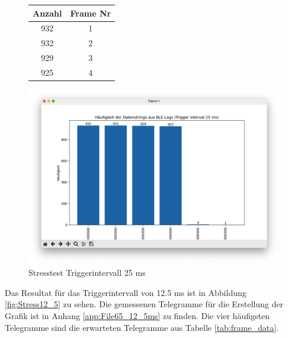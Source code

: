 \begin{figure}[H]
    \centering
    \begin{minipage}{0.29 \textwidth}
        \begin{tabular}{c||c}
            \toprule
            \textbf{Anzahl} & \textbf{Frame Nr} \\ 
            \midrule
            932 & 1\\
            932 & 2\\
            929 & 3\\
            925 & 4\\
            \bottomrule
        \end{tabular}
    \end{minipage}
    \hfill
    \begin{minipage}{0.7 \textwidth}
        \includegraphics[width=\linewidth]{Figures/Chap4/Stesstest/Stress_25.png}
    \caption{Stresstest Triggerintervall 25 ms}
    \label{fig:Stress25}
    \end{minipage}
\end{figure}

Das Resultat für das Triggerintervall von 12.5 ms ist in Abbildung \ref{fig:Stress12_5} zu sehen. Die gemessenen Telegramme für die Erstellung der Grafik ist in Anhang \ref{app:File65_12_5ms} zu finden. Die vier häufigsten Telegramme sind die erwarteten Telegramme aus Tabelle \ref{tab:frame_data}.

